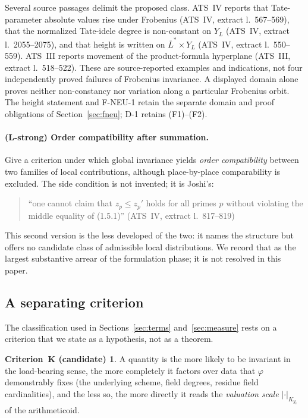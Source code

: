 \documentclass[11pt,a4paper]{article}
\theoremstyle{definition}
\theoremstyle{plain}
\theoremstyle{definition}
\newtheorem*{criterionK}{Criterion~K (candidate)}
\newcommand{\Ynum}{Y_L}
\newcommand{\anchor}[2]{(#1, extract l.~#2)}
\begin{document}
Several source passages delimit the proposed class. ATS~IV reports that
Tate-parameter absolute values rise under Frobenius
\anchor{ATS~IV}{567--569}, that the normalized Tate-idele degree is
non-constant on $\Ynum$ \anchor{ATS~IV}{2055--2075}, and that height
is written on $\overline L^*\times\Ynum$
\anchor{ATS~IV}{550--559}. ATS~III reports movement of the
product-formula hyperplane \anchor{ATS~III}{518--522}.
These are source-reported examples and indications, not four independently
proved failures of Frobenius invariance. A displayed domain alone proves
neither non-constancy nor variation along a particular Frobenius orbit.
The height statement and F-NEU-1 retain the separate domain and proof
obligations of Section~\ref{sec:fneu}; D-1 retains (F1)--(F2).

\paragraph{(L-strong) Order compatibility after summation.}
Give a criterion under which global invariance yields \emph{order compatibility}
between two families of local contributions, although place-by-place
comparability is excluded. The side condition is not invented; it is Joshi's:

\begin{quote}\small
``one cannot claim that $z_p \le z_p'$ holds for all primes $p$ without violating
the middle equality of (1.5.1)'' \hfill\anchor{ATS~IV}{817--819}
\end{quote}

This second version is the less developed of the two: it names the structure but
offers no candidate class of admissible local distributions. We record that as the
largest substantive arrear of the formulation phase; it is not resolved in this
paper.

\subsection{A separating criterion}

The classification used in Sections~\ref{sec:terms} and~\ref{sec:measure} rests on
a criterion that we state as a hypothesis, not as a theorem.

\begin{criterionK}
A quantity is the more likely to be invariant in the load-bearing sense, the more
completely it factors over data that $\varphi$ demonstrably fixes (the underlying
scheme, field degrees, residue field cardinalities), and the less so, the more
directly it reads the \emph{valuation scale} $|\cdot|_{K_{y_v}}$ of the
arithmeticoid.
\end{criterionK}
\end{document}

